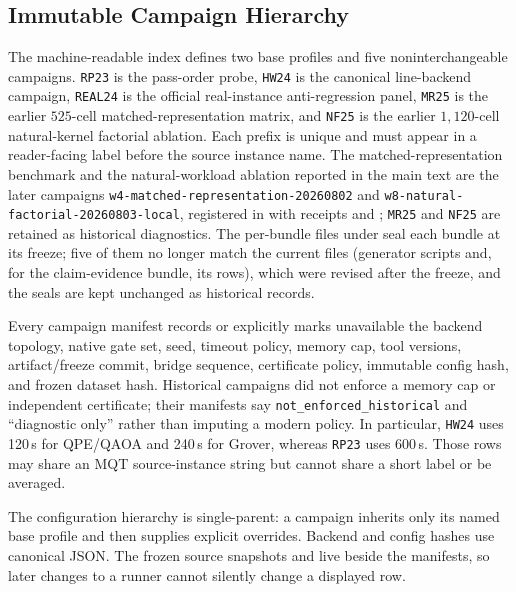 \subsection{Immutable Campaign Hierarchy}

The machine-readable index
 defines two base
profiles and five noninterchangeable campaigns.  \texttt{RP23} is the
pass-order probe, \texttt{HW24} is the canonical line-backend campaign,
\texttt{REAL24} is the official real-instance anti-regression panel,
\texttt{MR25} is the earlier $525$-cell matched-representation matrix, and
\texttt{NF25} is the earlier $1{,}120$-cell natural-kernel factorial
ablation.  Each prefix is unique and must appear in a reader-facing label
before the source instance name.  The matched-representation benchmark and
the natural-workload ablation reported in the main text are the later
campaigns \texttt{w4-matched-representation-20260802} and
\texttt{w8-natural-factorial-20260803-local}, registered in
 with receipts
 and
; \texttt{MR25} and
\texttt{NF25} are retained as historical diagnostics.  The per-bundle
 files under  seal each bundle
at its freeze; five of them no longer match the current files (generator
scripts and, for the claim-evidence bundle, its rows), which were revised
after the freeze, and the seals are kept unchanged as historical
records.

Every campaign manifest records or explicitly marks unavailable the backend
topology, native gate set, seed, timeout policy, memory cap, tool versions,
artifact/freeze commit, bridge sequence, certificate policy, immutable config
hash, and frozen dataset hash.  Historical campaigns did not enforce a memory
cap or independent certificate; their manifests say
\texttt{not\_enforced\_historical} and ``diagnostic only'' rather than imputing
a modern policy.  In particular, \texttt{HW24} uses 120\,s for QPE/QAOA and
240\,s for Grover, whereas \texttt{RP23} uses 600\,s.  Those rows may share an
MQT source-instance string but cannot share a short label or be averaged.

The configuration hierarchy is single-parent: a campaign inherits only its
named base profile and then supplies explicit overrides.  Backend and config
hashes use canonical JSON.  The frozen source snapshots
 and
 live beside the manifests, so later changes
to a runner cannot silently change a displayed row.

